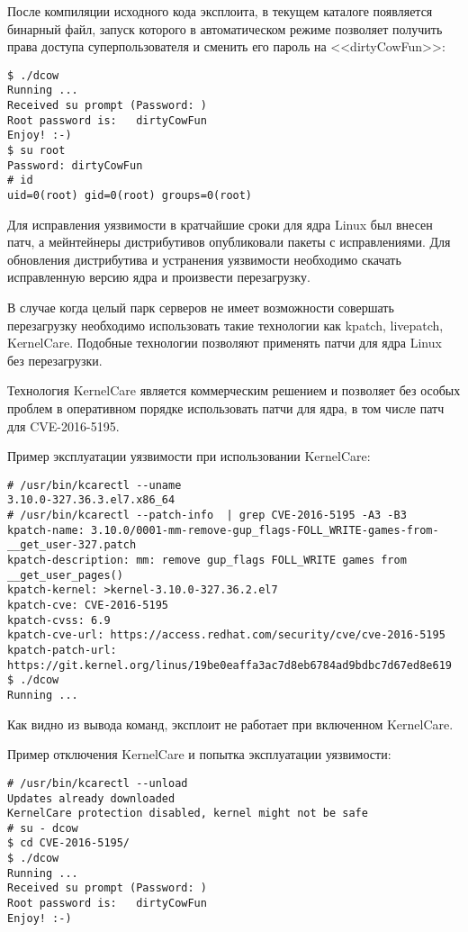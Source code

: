 После компиляции исходного кода эксплоита, в текущем каталоге появляется бинарный файл, запуск которого в автоматическом режиме позволяет получить права доступа суперпользователя и сменить его пароль на <<dirtyCowFun>>:
\begin{lstlisting}
$ ./dcow
Running ...
Received su prompt (Password: )
Root password is:   dirtyCowFun
Enjoy! :-)
$ su root
Password: dirtyCowFun
# id
uid=0(root) gid=0(root) groups=0(root)
\end{lstlisting}

Для исправления уязвимости в кратчайшие сроки для ядра Linux был внесен патч, а мейнтейнеры дистрибутивов опубликовали пакеты с исправлениями.
Для обновления дистрибутива и устранения уязвимости необходимо скачать исправленную версию ядра и произвести перезагрузку.

В случае когда целый парк серверов не имеет возможности совершать перезагрузку необходимо использовать такие технологии как kpatch, livepatch, KernelCare.
Подобные технологии позволяют применять патчи для ядра Linux без перезагрузки.

Технология KernelCare является коммерческим решением и позволяет без особых проблем в оперативном порядке использовать патчи для ядра, в том числе патч для CVE-2016-5195.

Пример эксплуатации уязвимости при использовании KernelCare:

\begin{lstlisting}
# /usr/bin/kcarectl --uname
3.10.0-327.36.3.el7.x86_64
# /usr/bin/kcarectl --patch-info  | grep CVE-2016-5195 -A3 -B3
kpatch-name: 3.10.0/0001-mm-remove-gup_flags-FOLL_WRITE-games-from-__get_user-327.patch
kpatch-description: mm: remove gup_flags FOLL_WRITE games from __get_user_pages()
kpatch-kernel: >kernel-3.10.0-327.36.2.el7
kpatch-cve: CVE-2016-5195
kpatch-cvss: 6.9
kpatch-cve-url: https://access.redhat.com/security/cve/cve-2016-5195
kpatch-patch-url: https://git.kernel.org/linus/19be0eaffa3ac7d8eb6784ad9bdbc7d67ed8e619
$ ./dcow
Running ...
\end{lstlisting}

Как видно из вывода команд, эксплоит не работает при включенном KernelCare.

Пример отключения KernelCare и попытка эксплуатации уязвимости:
\begin{lstlisting}
# /usr/bin/kcarectl --unload
Updates already downloaded
KernelCare protection disabled, kernel might not be safe
# su - dcow
$ cd CVE-2016-5195/
$ ./dcow
Running ...
Received su prompt (Password: )
Root password is:   dirtyCowFun
Enjoy! :-)
\end{lstlisting}

